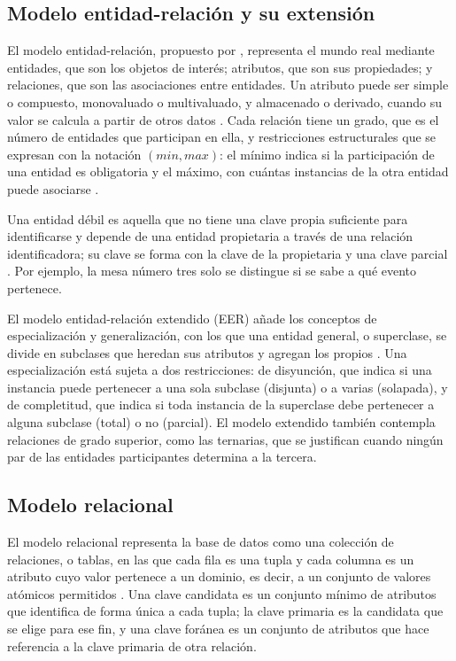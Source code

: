 \subsection{Modelo entidad-relación y su extensión}

El modelo entidad-relación, propuesto por \textcite{chen_er_model}, representa el mundo real mediante entidades, que son los objetos de interés; atributos, que son sus propiedades; y relaciones, que son las asociaciones entre entidades. Un atributo puede ser simple o compuesto, monovaluado o multivaluado, y almacenado o derivado, cuando su valor se calcula a partir de otros datos \parencite{elmasri_navathe}. Cada relación tiene un grado, que es el número de entidades que participan en ella, y restricciones estructurales que se expresan con la notación $(\mathit{min}, \mathit{max})$: el mínimo indica si la participación de una entidad es obligatoria y el máximo, con cuántas instancias de la otra entidad puede asociarse \parencite{elmasri_navathe}.

Una entidad débil es aquella que no tiene una clave propia suficiente para identificarse y depende de una entidad propietaria a través de una relación identificadora; su clave se forma con la clave de la propietaria y una clave parcial \parencite{elmasri_navathe}. Por ejemplo, la mesa número tres solo se distingue si se sabe a qué evento pertenece.

El modelo entidad-relación extendido (EER) añade los conceptos de especialización y generalización, con los que una entidad general, o superclase, se divide en subclases que heredan sus atributos y agregan los propios \parencite{elmasri_navathe}. Una especialización está sujeta a dos restricciones: de disyunción, que indica si una instancia puede pertenecer a una sola subclase (disjunta) o a varias (solapada), y de completitud, que indica si toda instancia de la superclase debe pertenecer a alguna subclase (total) o no (parcial). El modelo extendido también contempla relaciones de grado superior, como las ternarias, que se justifican cuando ningún par de las entidades participantes determina a la tercera.

\subsection{Modelo relacional}

El modelo relacional representa la base de datos como una colección de relaciones, o tablas, en las que cada fila es una tupla y cada columna es un atributo cuyo valor pertenece a un dominio, es decir, a un conjunto de valores atómicos permitidos \parencite{elmasri_navathe}. Una clave candidata es un conjunto mínimo de atributos que identifica de forma única a cada tupla; la clave primaria es la candidata que se elige para ese fin, y una clave foránea es un conjunto de atributos que hace referencia a la clave primaria de otra relación.

